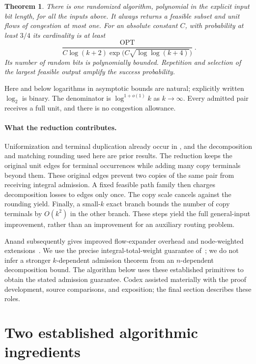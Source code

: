 \documentclass[acmsmall,11pt,screen,nonacm]{acmart}
\newtheorem{theorem}{Theorem}
\newcommand{\OPT}{\operatorname{OPT}}
\begin{document}
\begin{theorem}\label{thm:main}
There is one randomized algorithm, polynomial in the explicit input bit
length, for all the inputs above. It always returns a feasible subset and
unit flows of congestion at most one. For an absolute constant $C$, with
probability at least $3/4$ its cardinality is at least
\[
 \frac{\OPT}{C\log(k+2)\exp\!\bigl(C\sqrt{\log\log(k+4)}\bigr)}.
\]
Its number of random bits is polynomially bounded. Repetition and selection
of the largest feasible output amplify the success probability.
\end{theorem}

Here and below logarithms in asymptotic bounds are natural; explicitly written
$\log_2$ is binary. The denominator is $\log^{1+o(1)}k$ as $k\to\infty$.
Every admitted pair receives a full unit, and there is no congestion allowance.

\paragraph{What the reduction contributes.}
Uniformization and terminal duplication already occur in
\cite[Lemma~1.1]{CKS05}, and the decomposition and matching rounding used here
are prior results. The reduction keeps the original unit edges for terminal
occurrences while adding many copy terminals beyond them. These original
edges prevent two copies of the same pair from receiving integral admission.
A fixed feasible path family then charges decomposition losses to edges only
once. The copy scale cancels against the rounding yield. Finally, a small-$k$
exact branch bounds the number of copy terminals by $O(k^2)$ in the other
branch. These steps yield the full general-input improvement, rather than
an improvement for an auxiliary routing problem.

Anand subsequently gives improved flow-expander overhead and node-weighted
extensions~\cite[Theorems~1.4 and~5.1]{Anand26}. We use the precise
integral-total-weight guarantee of~\cite{BJS26}; we do not infer a stronger
$k$-dependent admission theorem from an $n$-dependent decomposition bound.
The algorithm below uses these established primitives to obtain the stated
admission guarantee. Codex assisted materially with the proof development,
source comparisons, and exposition; the final section describes these roles.

\section{Two established algorithmic ingredients}\label{sec:ingredients}
\end{document}
